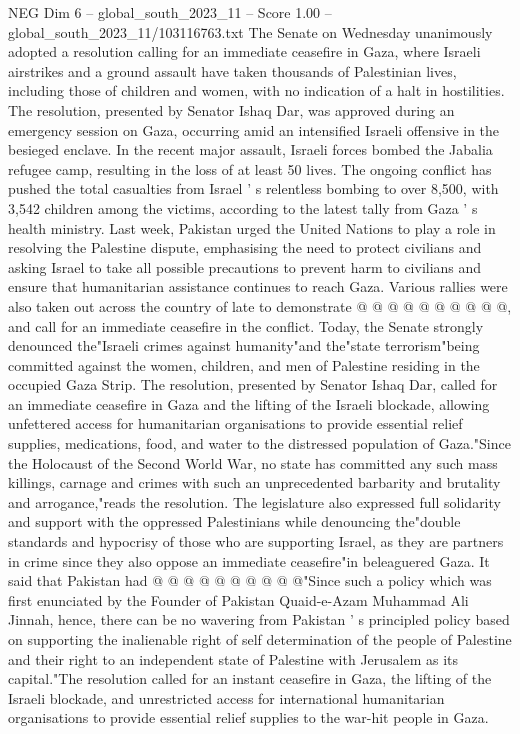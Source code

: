 \begin{textsample}{NEG Dim 6 – global\_south\_2023\_11 – Score 1.00 – global\_south\_2023\_11/103116763.txt}  \label{ex:f6_neg_194}
The Senate on Wednesday unanimously adopted a resolution calling for an immediate ceasefire in Gaza, where Israeli airstrikes and a ground assault have taken thousands of Palestinian lives, including those of children and women, with no indication of a halt in hostilities.
The resolution, presented by Senator Ishaq Dar, was approved during an emergency session on Gaza, occurring amid an intensified Israeli offensive in the besieged enclave.
In the recent major assault, Israeli forces bombed the Jabalia refugee camp, resulting in the loss of at least 50 lives.
The ongoing conflict has pushed the total casualties from Israel ' s relentless bombing to over 8,500, with 3,542 children among the victims, according to the latest tally from Gaza ' s health ministry.
Last week, Pakistan urged the United Nations to play a role in resolving the Palestine dispute, emphasising the need to protect civilians and asking Israel to take all possible precautions to prevent harm to civilians and ensure that humanitarian assistance continues to reach Gaza.
Various rallies were also taken out across the country of late to demonstrate @ @ @ @ @ @ @ @ @ @, and call for an immediate ceasefire in the conflict.
Today, the Senate strongly denounced the"Israeli crimes against humanity"and the"state terrorism"being committed against the women, children, and men of Palestine residing in the occupied Gaza Strip.
The resolution, presented by Senator Ishaq Dar, called for an immediate ceasefire in Gaza and the lifting of the Israeli blockade, allowing unfettered access for humanitarian organisations to provide essential relief supplies, medications, food, and water to the distressed population of Gaza."Since the Holocaust of the Second World War, no state has committed any such mass killings, carnage and crimes with such an unprecedented barbarity and brutality and arrogance,"reads the resolution.
The legislature also expressed full solidarity and support with the oppressed Palestinians while denouncing the"double standards and hypocrisy of those who are supporting Israel, as they are partners in crime since they also oppose an immediate ceasefire"in beleaguered Gaza.
It said that Pakistan had @ @ @ @ @ @ @ @ @ @"Since such a policy which was first enunciated by the Founder of Pakistan Quaid-e-Azam Muhammad Ali Jinnah, hence, there can be no wavering from Pakistan ' s principled policy based on supporting the inalienable right of self determination of the people of Palestine and their right to an independent state of Palestine with Jerusalem as its capital."The resolution called for an instant ceasefire in Gaza, the lifting of the Israeli blockade, and unrestricted access for international humanitarian organisations to provide essential relief supplies to the war-hit people in Gaza.

\end{textsample}
